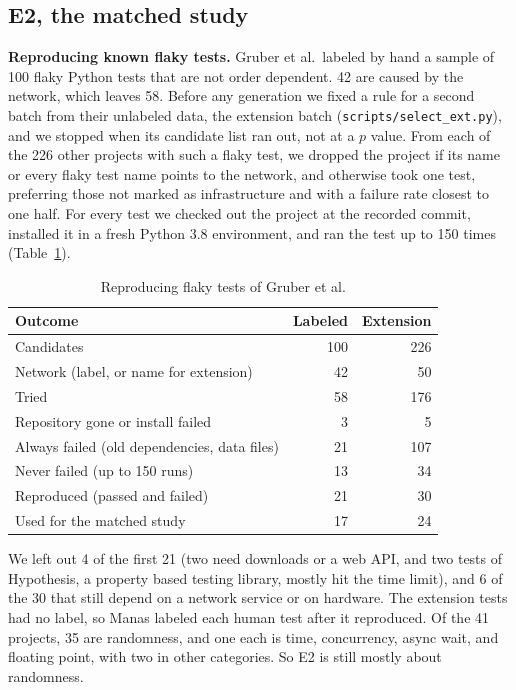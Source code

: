 \documentclass[sigconf,nonacm]{acmart}
\begin{document}
\subsection{E2, the matched study}
\label{sec:matched}
\textbf{Reproducing known flaky tests.} Gruber et al.\ labeled by hand a sample of 100 flaky Python tests that are not order dependent. 42 are caused by the network, which leaves 58. Before any generation we fixed a rule for a second batch from their unlabeled data, the extension batch (\texttt{scripts/select\_ext.py}), and we stopped when its candidate list ran out, not at a $p$ value. From each of the 226 other projects with such a flaky test, we dropped the project if its name or every flaky test name points to the network, and otherwise took one test, preferring those not marked as infrastructure and with a failure rate closest to one half. For every test we checked out the project at the recorded commit, installed it in a fresh Python 3.8 environment, and ran the test up to 150 times (Table~\ref{tab:repro}).

\begin{table}[h]
\caption{Reproducing flaky tests of Gruber et al.}
\label{tab:repro}
\small
\begin{tabular}{lrr}
\toprule
Outcome & Labeled & Extension \\
\midrule
Candidates & 100 & 226 \\
\quad Network (label, or name for extension) & 42 & 50 \\
Tried & 58 & 176 \\
\quad Repository gone or install failed & 3 & 5 \\
\quad Always failed (old dependencies, data files) & 21 & 107 \\
\quad Never failed (up to 150 runs) & 13 & 34 \\
\quad Reproduced (passed and failed) & 21 & 30 \\
Used for the matched study & 17 & 24 \\
\bottomrule
\end{tabular}
\end{table}

We left out 4 of the first 21 (two need downloads or a web API, and two tests of Hypothesis, a property based testing library, mostly hit the time limit), and 6 of the 30 that still depend on a network service or on hardware. The extension tests had no label, so Manas labeled each human test after it reproduced. Of the 41 projects, 35 are randomness, and one each is time, concurrency, async wait, and floating point, with two in other categories. So E2 is still mostly about randomness.
\end{document}
